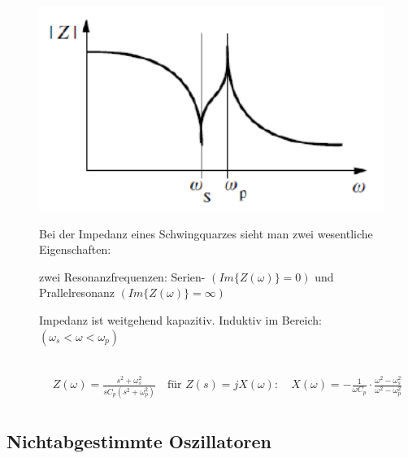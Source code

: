 \begin{figure}[h!]
\begin{minipage}{0.3\textwidth}
	\includegraphics[width=1.0\textwidth]{images/Impedanz(Frequenz)_Schwingquarz}
	\end{minipage}
	\begin{minipage}{0.6\textwidth}
      \vspace{0.5cm}
      Bei der Impedanz eines Schwingquarzes sieht man zwei wesentliche Eigenschaften:
      \begin{compactitem}
        \item zwei Resonanzfrequenzen: Serien- $(Im\{Z(\omega)\}=0)$ und Prallelresonanz $(Im\{Z(\omega)\}=\infty)$
        \item Impedanz ist weitgehend kapazitiv. Induktiv im Bereich:\\ $(\omega_s < \omega < \omega_p)$\\\\ 
      \end{compactitem}
      \begin{equation*} 
        \begin{split} 
         & Z (\omega)=\frac{s^2+\omega _s ^2}{sC_p(s^2+\omega_p ^2)} \quad \text{für } Z(s) = jX(\omega): \quad X(\omega)=-\frac{1}{\omega C_p}\cdot \frac{\omega^2-\omega_s ^2}{\omega^2-\omega_p ^2}\\
        \end{split} 
      \end{equation*}
	\end{minipage}
\end{figure}

\FloatBarrier
\subsection{Nichtabgestimmte Oszillatoren}

